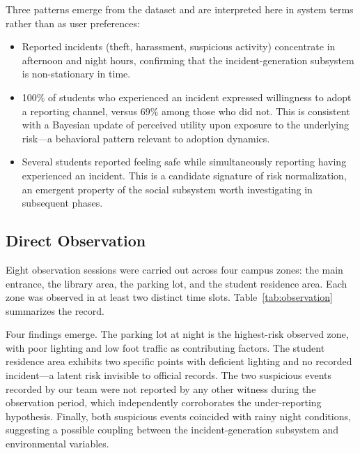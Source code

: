 \documentclass[conference]{IEEEtran}
\begin{document}
Three patterns emerge from the dataset and are interpreted here in
system terms rather than as user preferences:
\begin{itemize}[leftmargin=*,itemsep=2pt]
\item Reported incidents (theft, harassment, suspicious activity)
      concentrate in afternoon and night hours, confirming that the
      incident-generation subsystem is non-stationary in time.
\item 100\% of students who experienced an incident expressed
      willingness to adopt a reporting channel, versus 69\% among
      those who did not. This is consistent with a Bayesian update of
      perceived utility upon exposure to the underlying risk---a
      behavioral pattern relevant to adoption dynamics.
\item Several students reported feeling safe while simultaneously
      reporting having experienced an incident. This is a candidate
      signature of risk normalization, an emergent property of the
      social subsystem worth investigating in subsequent phases.
\end{itemize}

\subsection{Direct Observation}
Eight observation sessions were carried out across four campus zones:
the main entrance, the library area, the parking lot, and the student
residence area. Each zone was observed in at least two distinct time
slots. Table~\ref{tab:observation} summarizes the record.

\begin{table}[h]
\caption{Direct Observation Record --- 8 Sessions Across 4 Campus Zones.}
\label{tab:observation}
\centering
{}
\end{table}

Four findings emerge. The parking lot at night is the highest-risk
observed zone, with poor lighting and low foot traffic as contributing
factors. The student residence area exhibits two specific points with
deficient lighting and no recorded incident---a latent risk invisible
to official records. The two suspicious events recorded by our team
were not reported by any other witness during the observation period,
which independently corroborates the under-reporting hypothesis.
Finally, both suspicious events coincided with rainy night conditions,
suggesting a possible coupling between the incident-generation
subsystem and environmental variables.
\end{document}
